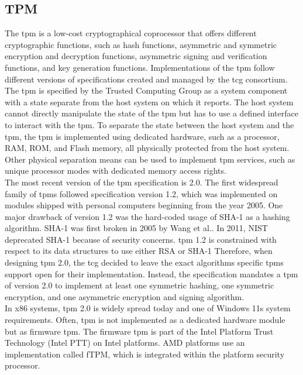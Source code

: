 \subsection{TPM}
\label{sec:20:tpm}
The \gls{tpm} is a low-cost cryptographical coprocessor that offers different
cryptographic functions, such as hash functions, asymmetric and symmetric
encryption and decryption functions, asymmetric signing and verification
functions, and key generation functions. Implementations of the \gls{tpm} follow
different versions of specifications created and managed by the \gls{tcg}
consortium.\cite{tpm_architecture} The \gls{tpm} is specified by the Trusted
Computing Group as a system component with a state separate from the host system
on which it reports. The host system cannot directly manipulate the state of the
\gls{tpm} but has to use a defined interface to interact with the \gls{tpm}. To
separate the state between the host system and the \gls{tpm}, the \gls{tpm} is
implemented using dedicated hardware, such as a processor, RAM, ROM, and Flash
memory, all physically protected from the host system. Other physical separation
means can be used to implement \gls{tpm} services, such as unique processor
modes with dedicated memory access rights.\\

The most recent version of the \gls{tpm} specification is 2.0. The first
widespread family of \gls{tpm}s followed specification version 1.2, which was
implemented on modules shipped with personal computers beginning from the year
2005.\cite{arthur2015practical} One major drawback of version 1.2 was the
hard-coded usage of SHA-1 as a hashing algorithm. SHA-1 was first broken in 2005
by Wang et al.\cite{wang2005collision}. In 2011, NIST deprecated SHA-1 because
of security concerns.\cite{nist-sha1} \gls{tpm} 1.2 is constrained with respect
to its data structures to use either RSA or SHA-1\cite{tpm_architecture}
Therefore, when designing \gls{tpm} 2.0, the \gls{tcg} decided to leave the
exact algorithms specific \gls{tpm}s support open for their implementation.
Instead, the specification mandates a \gls{tpm} of version 2.0 to implement at
least one symmetric hashing, one symmetric encryption, and one asymmetric
encryption and signing algorithm. \\

In x86 systems, \gls{tpm} 2.0 is widely spread today and one of Windows 11s
system requirements. Often, \gls{tpm} is not implemented as a dedicated hardware
module but as firmware \gls{tpm}. The firmware \gls{tpm} is part of the Intel
Platform Trust Technology (Intel PTT) on Intel platforms. AMD platforms use an
implementation called fTPM, which is integrated within the platform security
processor.\cite{pirker2024brief} \\

